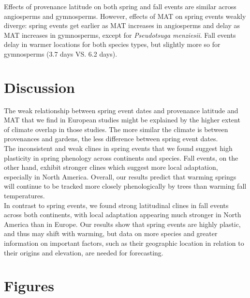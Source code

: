 \documentclass{article}
\begin{document}
Effects of provenance latitude on both spring and fall events are similar across angiosperms and gymnosperms. However, effects of MAT on spring events weakly diverge: spring events get earlier as MAT increases in angiosperms and delay as MAT increases in gymnosperms, except for \emph{Pseudotsuga menziesii}. Fall events delay in warmer locations for both species types, but slightly more so for gymnosperms (3.7 days VS. 6.2 days).


\section{Discussion}




The weak relationship between spring event dates and provenance latitude and MAT that we find in European studies might be explained by the higher extent of climate overlap in those studies. The more similar the climate is between provenances and gardens, the less difference between spring event dates.
\\

The inconsistent and weak clines in spring events that we found suggest high plasticity in spring phenology across continents and species. Fall events, on the other hand, exhibit stronger clines which suggest more local adaptation, especially in North America. Overall, our results predict that warming springs will continue to be tracked more closely phenologically by trees than warming fall temperatures.
\\

In contrast to spring events, we found strong latitudinal clines in fall events across both continents, with local adaptation appearing much stronger in North America than in Europe. Our results show that spring events are highly plastic, and thus may shift with warming, but data on more species and greater information on important factors, such as their geographic location in relation to their origins and elevation, are needed for forecasting. 




\section{Figures}
\end{document}
